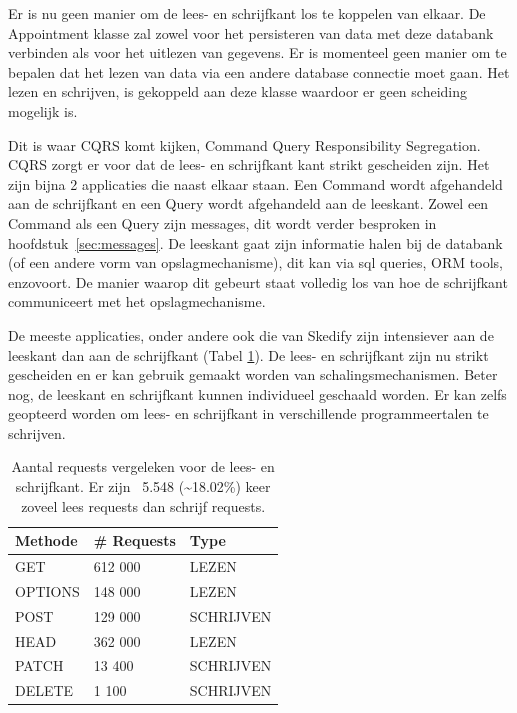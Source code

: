 
Er is nu geen manier om de lees- en schrijfkant los te koppelen van elkaar. De Appointment klasse zal zowel voor het persisteren van data met deze databank verbinden als voor het uitlezen van gegevens. Er is momenteel geen manier om te bepalen dat het lezen van data via een andere database connectie moet gaan. Het lezen en schrijven, is gekoppeld aan deze klasse waardoor er geen scheiding mogelijk is.

Dit is waar \gls{CQRS} komt kijken, Command Query Responsibility Segregation. \gls{CQRS} zorgt er voor dat de lees- en schrijfkant kant strikt gescheiden zijn. Het zijn bijna 2 applicaties die naast elkaar staan. Een Command wordt afgehandeld aan de schrijfkant en een Query wordt afgehandeld aan de leeskant. Zowel een Command als een Query zijn messages, dit wordt verder besproken in hoofdstuk~\ref{sec:messages}. De leeskant gaat zijn informatie halen bij de databank (of een andere vorm van opslagmechanisme), dit kan via sql queries, ORM tools, enzovoort. De manier waarop dit gebeurt staat volledig los van hoe de schrijfkant communiceert met het opslagmechanisme.

De meeste applicaties, onder andere ook die van Skedify zijn intensiever aan de leeskant dan aan de schrijfkant (Tabel \ref{cqrs-read-writes}). De lees- en schrijfkant zijn nu strikt gescheiden en er kan gebruik gemaakt worden van schalingsmechanismen. Beter nog, de leeskant en schrijfkant kunnen individueel geschaald worden. Er kan zelfs geopteerd worden om lees- en schrijfkant in verschillende programmeertalen te schrijven.

\begin{table}[h]
\centering
\caption[Aantal requests vergeleken voor de lees- en schrijfkant.]{Aantal requests vergeleken voor de lees- en schrijfkant. Er zijn ~5.548 (\textasciitilde18.02\%) keer zoveel lees requests dan schrijf requests.}
\begin{tabular}{lll} \toprule
Methode & \# Requests & Type        \\ \midrule
GET     & 612 000     & LEZEN       \\
OPTIONS & 148 000     & LEZEN       \\
POST    & 129 000     & SCHRIJVEN   \\
HEAD    & 362 000     & LEZEN       \\
PATCH   & 13 400      & SCHRIJVEN   \\
DELETE  & 1 100       & SCHRIJVEN   \\ \bottomrule
\end{tabular}
\label{cqrs-read-writes}
\end{table}

